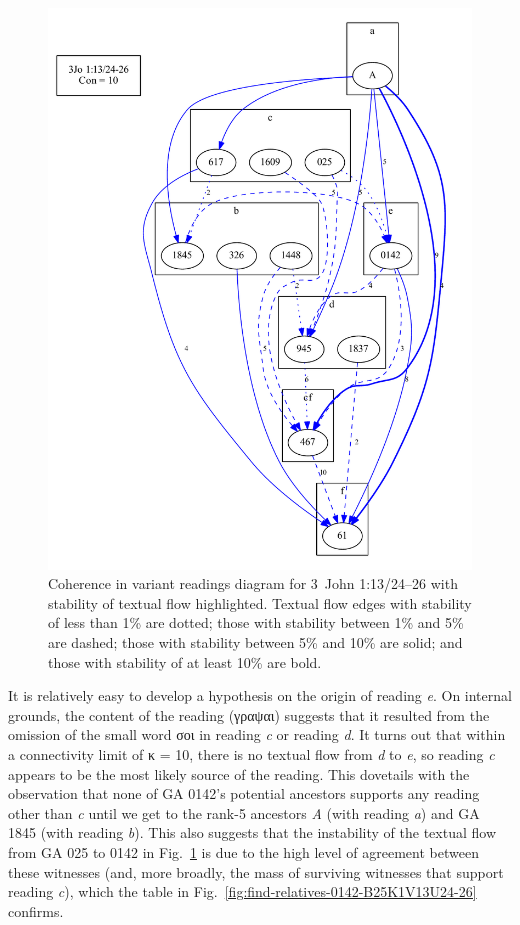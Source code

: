 \documentclass[a4paper, 12pt]{article}
\begin{document}
	\newpage
	
	\begin{figure}[h!]
		\centering
		\includegraphics[scale=0.65]{../graphics/B25K1V13U24-26-coherence-variants-strengths.pdf}
		\caption{Coherence in variant readings diagram for 3~John 1:13/24–26 with stability of textual flow highlighted. Textual flow edges with stability of less than 1\% are dotted; those with stability between 1\% and 5\% are dashed; those with stability between 5\% and 10\% are solid; and those with stability of at least 10\% are bold.}
		\label{fig:coherence-variants-strengths}
	\end{figure}
	
	\newpage
	
	It is relatively easy to develop a hypothesis on the origin of reading \emph{e}. On internal grounds, the content of the reading (γραψαι) suggests that it resulted from the omission of the small word σοι in reading \emph{c} or reading \emph{d}. It turns out that within a connectivity limit of κ = 10, there is no textual flow from \emph{d} to \emph{e}, so reading \emph{c} appears to be the most likely source of the reading. This dovetails with the observation that none of GA 0142's potential ancestors supports any reading other than \emph{c} until we get to the rank-5 ancestors \emph{A} (with reading \emph{a}) and GA 1845 (with reading \emph{b}). This also suggests that the instability of the textual flow from GA 025 to 0142 in Fig.~\ref{fig:coherence-variants-strengths} is due to the high level of agreement between these witnesses (and, more broadly, the mass of surviving witnesses that support reading \emph{c}), which the table in Fig.~\ref{fig:find-relatives-0142-B25K1V13U24-26} confirms.
	
\end{document}
